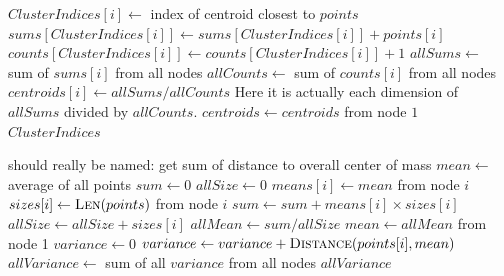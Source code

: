 \documentclass{article}
\begin{document}
\begin{algorithm}
\caption{}
\begin{algorithmic}[1]
				\State $ClusterIndices[i] \gets$ index of centroid closest to $points$
			\EndFor
				\State $sums[ClusterIndices[i]] \gets sums[ClusterIndices[i]] + points[i]$
				\State $counts[ClusterIndices[i]] \gets counts[ClusterIndices[i]] + 1$
			\EndFor
					\State $allSums \gets$ sum of $sums[i]$ from all nodes
					\State $allCounts \gets$ sum of $counts[i]$ from all nodes
					\State $centroids[i] \gets allSums / allCounts$ \Comment Here it is actually
					each dimension of $allSums$ divided by $allCounts$.
				\EndFor
			\EndIf
			\State $centroids \gets centroids$ from node $1$
		\EndWhile
		\State \Return $ClusterIndices$
	\EndFunction
\end{algorithmic}
\end{algorithm}

\begin{algorithm}
\caption{}
\begin{algorithmic}[1]
	 \Comment should really be named: get sum of distance to overall
	center of mass
		\State $mean \gets$ average of all points
			\State $sum \gets 0$
			\State $allSize \gets 0$
				\State $means[i] \gets mean$ from node $i$
				\State $sizes[i] \gets \Call{Len}{points}$ from node $i$
				\State $sum \gets sum + means[i] \times sizes[i]$
				\State $allSize \gets allSize + sizes[i]$
			\EndFor
			\State $allMean \gets sum / allSize$
		\EndIf
		\State $mean \gets allMean$ from node 1
		\State $variance \gets 0$
			\State $variance \gets variance + \Call{Distance}{points[i], mean}$
		\EndFor
		\State $allVariance \gets$ sum of all $variance$ from all nodes
		\State \Return $allVariance$
	\EndFunction
\end{algorithmic}
\end{algorithm}
\end{document}
